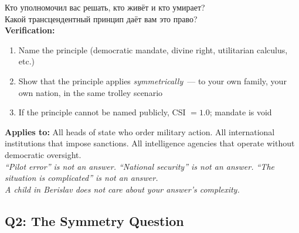 \documentclass[11pt,a4paper]{article}
\theoremstyle{definition}
\theoremstyle{remark}
\begin{document}
\begin{tcolorbox}[enhanced, breakable,
  colback=gray!5, colframe=black!60,
  title={\textbf{Q1 — Mandate:}
    \textit{Who authorized you to decide
    who lives and who dies?}},
  fonttitle=\bfseries, boxrule=1pt]

\foreignlanguage{russian}{
Кто уполномочил вас решать, кто живёт и кто умирает?\\
Какой трансцендентный принцип даёт вам это право?\\[0.2cm]
}
\textbf{Verification:}
\begin{enumerate}[noitemsep, leftmargin=1.5cm]
  \item Name the principle (democratic mandate,
    divine right, utilitarian calculus, etc.)
  \item Show that the principle applies \textit{symmetrically}~---
    to your own family, your own nation,
    in the same trolley scenario
  \item If the principle cannot be named publicly,
    CSI $= 1.0$; mandate is void
\end{enumerate}

\textbf{Applies to:}
All heads of state who order military action.
All international institutions that impose sanctions.
All intelligence agencies that operate without democratic oversight.\\[0.1cm]

\textit{``Pilot error'' is not an answer.
``National security'' is not an answer.
``The situation is complicated'' is not an answer.\\
A child in Berislav does not care about your answer's complexity.}
\end{tcolorbox}

\subsection{Q2: The Symmetry Question}
\label{sec:q2}
\end{document}
